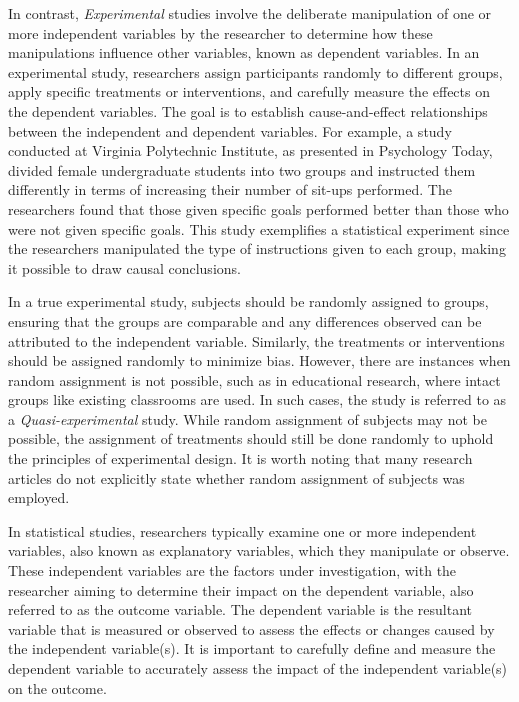 \documentclass{article}
\begin{document}
In contrast, \emph{Experimental} studies involve the deliberate manipulation of one or more independent variables by the researcher to determine how these manipulations influence other variables, known as dependent variables. In an experimental study, researchers assign participants randomly to different groups, apply specific treatments or interventions, and carefully measure the effects on the dependent variables. The goal is to establish cause-and-effect relationships between the independent and dependent variables. For example, a study conducted at Virginia Polytechnic Institute, as presented in Psychology Today, divided female undergraduate students into two groups and instructed them differently in terms of increasing their number of sit-ups performed. The researchers found that those given specific goals performed better than those who were not given specific goals. This study exemplifies a statistical experiment since the researchers manipulated the type of instructions given to each group, making it possible to draw causal conclusions.

In a true experimental study, subjects should be randomly assigned to groups, ensuring that the groups are comparable and any differences observed can be attributed to the independent variable. Similarly, the treatments or interventions should be assigned randomly to minimize bias. However, there are instances when random assignment is not possible, such as in educational research, where intact groups like existing classrooms are used. In such cases, the study is referred to as a \emph{Quasi-experimental} study. While random assignment of subjects may not be possible, the assignment of treatments should still be done randomly to uphold the principles of experimental design. It is worth noting that many research articles do not explicitly state whether random assignment of subjects was employed.

In statistical studies, researchers typically examine one or more independent variables, also known as explanatory variables, which they manipulate or observe. These independent variables are the factors under investigation, with the researcher aiming to determine their impact on the dependent variable, also referred to as the outcome variable. The dependent variable is the resultant variable that is measured or observed to assess the effects or changes caused by the independent variable(s). It is important to carefully define and measure the dependent variable to accurately assess the impact of the independent variable(s) on the outcome.
\end{document}
